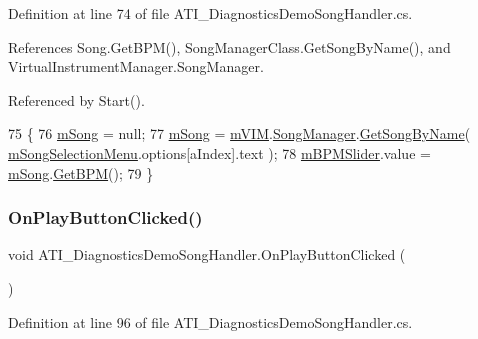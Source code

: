 Definition at line 74 of file A\+T\+I\+\_\+\+Diagnostics\+Demo\+Song\+Handler.\+cs.



References Song.\+Get\+B\+P\+M(), Song\+Manager\+Class.\+Get\+Song\+By\+Name(), and Virtual\+Instrument\+Manager.\+Song\+Manager.



Referenced by Start().


\begin{DoxyCode}
75     \{
76         \hyperlink{class_a_t_i___diagnostics_demo_song_handler_a8d34a075cf131a43db5e81cba4c9ea9d}{mSong} = null;
77         \hyperlink{class_a_t_i___diagnostics_demo_song_handler_a8d34a075cf131a43db5e81cba4c9ea9d}{mSong} = \hyperlink{class_a_t_i___diagnostics_demo_song_handler_ac3a2216a6de2023d3dd19caa25de7d6f}{mVIM}.\hyperlink{group___v_i_m_pub_ga33dae94932c10c66db76a0eebec76b01}{SongManager}.\hyperlink{group___s_m_pub_func_gafe818c55bd858c52c95a2fa7a566006a}{GetSongByName}( 
      \hyperlink{class_a_t_i___diagnostics_demo_song_handler_a9c44359a719997d03d3ce26afa5609db}{mSongSelectionMenu}.options[aIndex].text );
78         \hyperlink{class_a_t_i___diagnostics_demo_song_handler_ad501644f4b61fe763b75e5b63aa5badc}{mBPMSlider}.value = \hyperlink{class_a_t_i___diagnostics_demo_song_handler_a8d34a075cf131a43db5e81cba4c9ea9d}{mSong}.\hyperlink{group___song_pub_func_gaaaf3d27d474713d7d368e3fd4c570be0}{GetBPM}();
79     \}
\end{DoxyCode}
\mbox{\label{class_a_t_i___diagnostics_demo_song_handler_acb03659027c98d419fc6ff61dbf24356}} 
\subsubsection{\texorpdfstring{On\+Play\+Button\+Clicked()}{OnPlayButtonClicked()}}
{\footnotesize\ttfamily void A\+T\+I\+\_\+\+Diagnostics\+Demo\+Song\+Handler.\+On\+Play\+Button\+Clicked (\begin{DoxyParamCaption}{ }\end{DoxyParamCaption})}



Definition at line 96 of file A\+T\+I\+\_\+\+Diagnostics\+Demo\+Song\+Handler.\+cs.



